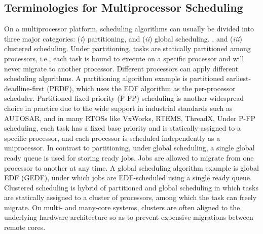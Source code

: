 

\subsection{Terminologies for Multiprocessor Scheduling}

On a multiprocessor platform, scheduling algorithms can usually be divided into three major categories: (\textit{i}) partitioning, and (\textit{ii}) global scheduling. , and (\textit{iii}) clustered scheduling. 
Under partitioning, tasks are statically partitioned among processors, i.e., each task is bound to execute on a specific processor and will never migrate to another processor. Different processors can apply different scheduling algorithms. A partitioning algorithm example is partitioned earliest-deadline-first (PEDF), which uses the EDF algorithm as the per-processor scheduler. 
Partitioned fixed-priority (P-FP) scheduling is another widespread choice in practice due to the wide support in industrial standards such as AUTOSAR, and in many RTOSs like VxWorks, RTEMS, ThreadX, \etc Under P-FP scheduling, each task has a fixed base priority and is statically assigned to a specific processor, and each processor is scheduled independently as a uniprocessor.  
 In contrast to partitioning, under global scheduling, a single global ready queue is used for storing ready jobs.  Jobs are allowed to migrate from one processor to another at any time. A global scheduling algorithm example is global EDF (GEDF), under which jobs are EDF-scheduled using a single ready queue.  
 Clustered scheduling is hybrid of partitioned and global scheduling in which tasks are statically assigned to a cluster of processors, among which the task can freely migrate. On multi- and many-core systems, clusters are often aligned to the underlying hardware architecture so as to prevent expensive migrations between remote cores. %




  
  
  